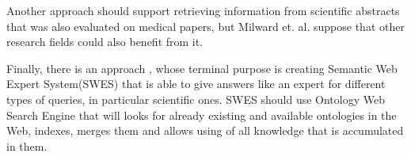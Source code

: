 		Another approach\cite{Mil05} should support retrieving information from scientific abstracts that was also evaluated on medical papers, but Milward et. al. suppose that other research fields could also benefit from it.
		
		Finally, there is an approach \cite{Ver15}, whose terminal purpose is creating Semantic Web Expert System(SWES) that is able to give answers like an expert for different types of queries, in particular scientific ones. SWES should use Ontology Web Search Engine that will looks for already existing and available ontologies in the Web, indexes, merges them and allows using of all knowledge that is accumulated in them.                 